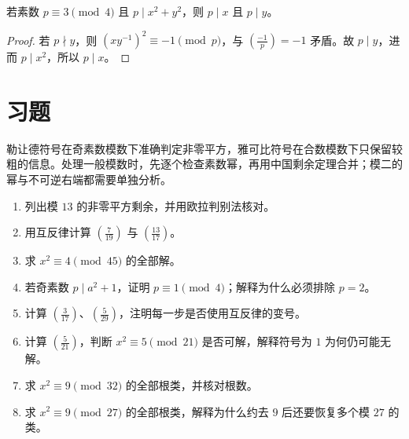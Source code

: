 \begin{corollary}
\label{cor:prime-three-mod-four}
若素数 $p\equiv3\pmod4$ 且 $p\mid x^2+y^2$，则 $p\mid x$ 且 $p\mid y$。
\end{corollary}
\begin{proof}
若 $p\nmid y$，则 $(xy^{-1})^2\equiv-1\pmod p$，与 $\left(\frac{-1}p\right)=-1$ 矛盾。故 $p\mid y$，进而 $p\mid x^2$，所以 $p\mid x$。
\end{proof}

\section{习题}

勒让德符号在奇素数模数下准确判定非零平方，雅可比符号在合数模数下只保留较粗的信息。处理一般模数时，先逐个检查素数幂，再用中国剩余定理合并；模二的幂与不可逆右端都需要单独分析。

\begin{enumerate}
 \item 列出模 $13$ 的非零平方剩余，并用欧拉判别法核对。
 \item 用互反律计算 $\left(\frac7{19}\right)$ 与 $\left(\frac{13}{17}\right)$。
 \item 求 $x^2\equiv4\pmod{45}$ 的全部解。
 \item 若奇素数 $p\mid a^2+1$，证明 $p\equiv1\pmod4$；解释为什么必须排除 $p=2$。
 \item\label{ex:quadratic-sign} 计算 $\left(\frac3{17}\right)$、$\left(\frac5{29}\right)$，注明每一步是否使用互反律的变号。
 \item\label{ex:quadratic-jacobi} 计算 $\left(\frac5{21}\right)$，判断 $x^2\equiv5\pmod{21}$ 是否可解，解释符号为 $1$ 为何仍可能无解。
 \item\label{ex:quadratic-two-power} 求 $x^2\equiv9\pmod{32}$ 的全部根类，并核对根数。
 \item\label{ex:quadratic-valuation} 求 $x^2\equiv9\pmod{27}$ 的全部根类，解释为什么约去 $9$ 后还要恢复多个模 $27$ 的类。
\end{enumerate}

